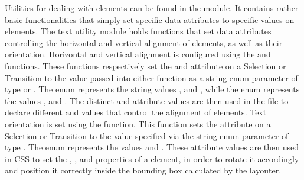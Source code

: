 Utilities for dealing with  elements can be found in the  module.
It contains rather basic functionalities that simply set specific data attributes to specific values on  elements.
The text utility module holds functions that set data attributes controlling the horizontal and vertical alignment of  elements, as well as their orientation.
Horizontal and vertical alignment is configured using the  and  functions.
These functions respectively set the  and  attribute on a Selection or Transition to the value passed into either function as a string enum parameter of type  or .
The  enum represents the string values ,  and , while the  enum represents the values ,  and .
The distinct  and  attribute values are then used in the  file to declare different  and  values that control the alignment of  elements.
Text orientation is set using the  function.
This function sets the  attribute on a Selection or Transition to the value specified via the string enum parameter of type .
The  enum represents the values  and .
These  attribute values are then used in CSS to set the , , and  properties of a  element, in order to rotate it accordingly and position it correctly inside the bounding box calculated by the layouter.



